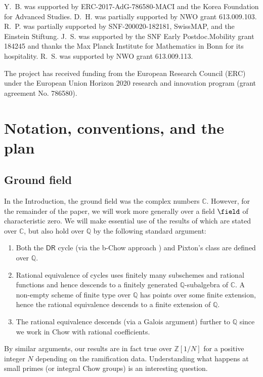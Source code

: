\documentclass[a4paper,12pt]{article} %
\newcommand{\bb}[1]{{\mathbb{#1}}}
\theoremstyle{definition}
\theoremstyle{plain}%
\begin{document}
Y.~B. was supported by ERC-2017-AdG-786580-MACI and the
Korea Foundation for Advanced Studies.
D.~H. was partially supported by NWO grant 613.009.103. 
R.~P. was partially supported by 
SNF-200020-182181, SwissMAP, and
the Einstein Stiftung. 
J.~S. was supported by the SNF Early Postdoc.Mobility grant 184245 and thanks
the Max Planck Institute for Mathematics in Bonn for its hospitality. 
R.~S. was supported by  NWO grant 613.009.113. 


The project has received funding from the European Research
Council (ERC) under the European Union Horizon 2020 research and
innovation program (grant agreement No. 786580).


\section{Notation, conventions, and the plan}


\subsection{Ground field}



In the Introduction, the ground field
was the complex numbers $\bb C$. However, for the remainder of the paper,
we will work more generally over a field ${\field}$ of characteristic zero. 
We will make essential use of the results of \cite{Janda2018Double-ramifica} which are stated over $\bb C$, 
but also
hold over $\bb Q$ by the following
standard argument:
\begin{enumerate}
\item[(i)] Both the $\mathsf{DR}$ cycle  (via the b-Chow approach \cite{Holmes2017Extending-the-d}) and Pixton's class are defined over $\bb Q$. 
\item[(ii)] Rational equivalence of cycles uses finitely many subschemes and rational functions and  hence descends to a finitely generated 
$\bb Q$-subalgebra of $\bb C$. A non-empty scheme of finite type over $\bb Q$ has points over some finite extension, hence the rational equivalence descends to a finite extension of $\bb Q$. 
\item[(iii)]
The rational equivalence descends (via a Galois argument)
further to $\bb Q$ since we work in Chow with rational coefficients. 
\end{enumerate}
By similar arguments,
our results are in fact true over $\bb Z[1/N]$ for a positive integer $N$ depending on the ramification data. Understanding what happens at small primes (or integral Chow groups)
is an interesting question. 
\end{document}
